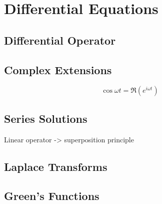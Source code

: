 \chapter{Differential Equations}

\section{Differential Operator}
\section{Complex Extensions}
\[\cos\omega t = \Re(e^{i\omega t})\] 

\section{Series Solutions}
Linear operator -> superposition principle
\section{Laplace Transforms}

\section{Green's Functions}
